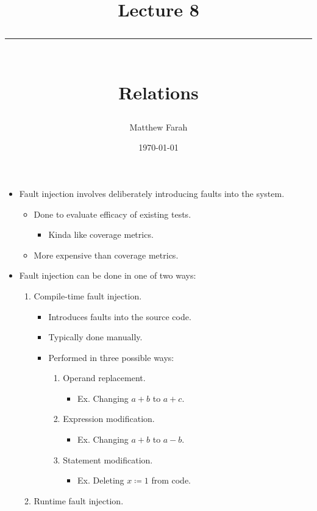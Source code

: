 \documentclass{article}
\date{
	\vspace{-.75em}
	{\large \today}
}
\title{
	\vspace*{-1.5em}
	{\Huge Lecture 8} \\
	\vspace{-1em}
	\rule{\textwidth/4}{.01em} \\
	\vspace{-.25em}
	{\Large Relations}
	\vspace{-.75em}
}
\author{
	{\large Matthew Farah}
}
\begin{document}
\maketitle
\pagestyle{fancy}

\fi

\begin{itemize}
	\item Fault injection involves deliberately introducing faults into the system.
	\begin{itemize}
		\item Done to evaluate efficacy of existing tests.
		\begin{itemize}
			\item Kinda like coverage metrics.
		\end{itemize}
		\item More expensive than coverage metrics.
	\end{itemize}
	\item Fault injection can be done in one of two ways:
	\begin{enumerate}
		\item Compile-time fault injection.
		\begin{itemize}
			\item Introduces faults into the source code.
			\item Typically done manually.
			\item Performed in three possible ways:
			\begin{enumerate}
				\item Operand replacement.
				\begin{itemize}
					\item Ex. Changing $a + b$ to $a + c$.
				\end{itemize}
				\item Expression modification.
				\begin{itemize}
					\item Ex. Changing $a + b$ to $a - b$.
				\end{itemize}
				\item Statement modification.
				\begin{itemize}
					\item Ex. Deleting $x \coloneq 1$ from code.
				\end{itemize}
			\end{enumerate}
		\end{itemize}
		\item Runtime fault injection.
		\begin{itemize}

\end{itemize}
\end{enumerate}
\end{itemize}
\end{document}

